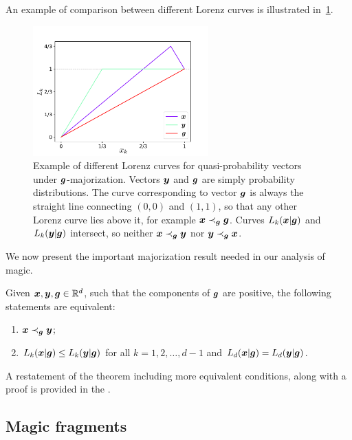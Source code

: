 An example of comparison between different Lorenz curves is illustrated in~\cref{fig:lctoy}.
\begin{figure}
    \centering
    \includegraphics[height=5cm]{sections/major/lctoy.pdf}
    \caption{Example of different Lorenz curves for quasi-probability vectors under $\bm{g}$-majorization.
    Vectors $\bm{y}$ and $\bm{g}$ are simply probability distributions.
    The curve corresponding to vector $\bm{g}$ is always the straight line connecting $(0,0)$ and $(1,1)$, so that any other Lorenz curve lies above it, for example $\bm{x} \prec_{\bm{g}} \bm{g}$.
    Curves $L_k(\bm{x}|\bm{g})$ and $L_k(\bm{y}|\bm{g})$ intersect, so neither $\bm{x} \prec_{\bm{g}} \bm{y}$ nor $\bm{y} \prec_{\bm{g}} \bm{x}$.
    }
    \label{fig:lctoy}
\end{figure}

We now present the important majorization result needed in our analysis of magic.
\begin{theorem}\label{thm:dmajor}
Given $\bm{x}, \bm{y}, \bm{g} \in \mathbb{R}^d$, such that the components of $\bm{g}$ are positive, the following statements are equivalent:
 \begin{enumerate}%
	\item\label{en:tm1} $\bm{x} \prec_{\bm{g}} \bm{y}$;
	\item\label{en:tm5} $L_k(\bm{x}|\bm{g}) \leq L_k(\bm{y}|\bm{g})$ for all $k=1,2,\dots, d-1$ and $L_d(\bm{x}|\bm{g}) = L_d(\bm{y}|\bm{g})$.
 \end{enumerate}
\end{theorem}
A restatement of the theorem including more equivalent conditions, along with a proof is provided in the .

\subsection{Magic fragments}\label{sec:magfrag}

